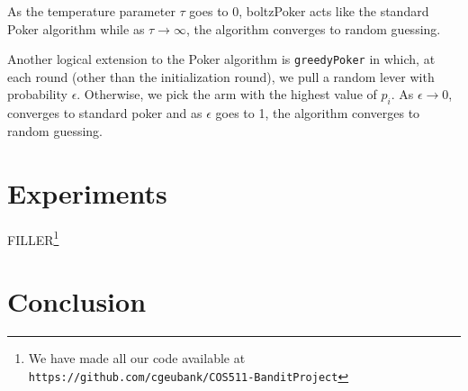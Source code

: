 \documentclass[12pt]{article}
\begin{document}
As the temperature parameter $\tau$ goes to 0, boltzPoker acts like the standard Poker algorithm while as $\tau \to \infty$, the algorithm converges to random guessing.

Another logical extension to the Poker algorithm is \texttt{greedyPoker} in which, at each round (other than the initialization round), we pull a random lever with probability $\epsilon$. Otherwise, we pick the arm with the highest value of $p_{i}$. As $\epsilon \to 0$,  converges to standard poker and as $\epsilon$ goes to 1, the algorithm converges to random guessing.

\section{Experiments}

FILLER\footnote{We have made all our code available at \texttt{https://github.com/cgeubank/COS511-BanditProject}}

\section{Conclusion}





\end{document}
